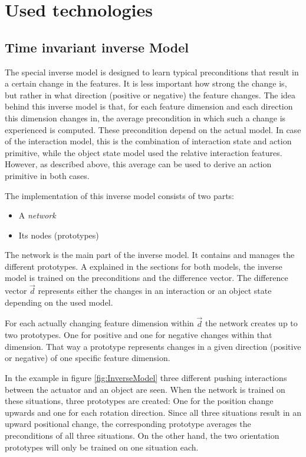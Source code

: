 \section{Used technologies \label{sec:technologies}}

\subsection{Time invariant inverse Model \label{sec:invModelRealization}} %

The special inverse model is designed to learn typical preconditions that result in a certain change in the features. It is less important how strong the change is, but rather in what direction (positive or negative) the feature changes. The idea behind this inverse model is that, for each feature dimension and each direction this dimension changes in, the average precondition in which such a change is experienced is computed. 
These precondition depend on the actual model. In case of the interaction model, this is the combination of interaction state and action primitive, while the object state model used the relative interaction features. However, as described above, this average can be used to derive an action primitive in both cases.

The implementation of this inverse model consists of two parts: 
\begin{itemize}
\item A \textit{network}
\item Its nodes (prototypes)
\end{itemize}

The network is the main part of the inverse model. It contains and manages the different prototypes. 
A explained in the sections for both models, the inverse model is trained on the preconditions and the difference vector. The difference vector $\vec{d}$ represents either the changes in an interaction or an object state depending on the used model.

For each actually changing feature dimension within $\vec{d}$ the network creates up to two prototypes. One for positive and one for negative changes within that dimension. That way a prototype represents changes in a given direction (positive or negative) of one specific feature dimension. 

In the example in figure \ref{fig:InverseModel} three different pushing interactions between the actuator and an object are seen. 
When the network is trained on these situations, three prototypes are created: One for the position change upwards and one for each rotation direction. 
Since all three situations result in an upward positional change, the corresponding prototype averages the preconditions of all three situations.
On the other hand, the two orientation prototypes will only be trained on one situation each.

